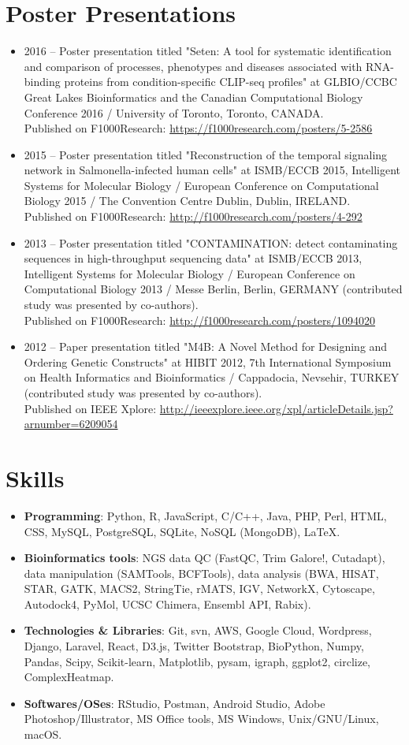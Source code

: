 \documentclass[a4paper,12pt]{article}
\newcommand{\resumeItem}[2]{
  \item\small{
    \textbf{#1}{: #2\vspace{-2pt}}
  }
}
\newcommand{\resumeItemUrl}[2]{
  \item\small{
    {#1}\\{#2\vspace{-2pt}}
  }
}
\newcommand{\resumeSubItem}[2]{\resumeItem{#1}{#2}\vspace{-4pt}}
\newcommand{\resumeSubItemUrl}[2]{\resumeItemUrl{#1}{#2}\vspace{-4pt}}
\newcommand{\resumeSubHeadingListStart}{\begin{itemize}[leftmargin=*]}
\newcommand{\resumeSubHeadingListEnd}{\end{itemize}}
\begin{document}
\section{Poster Presentations}
  \resumeSubHeadingListStart
    \resumeSubItemUrl{2016 -- Poster presentation titled "Seten: A tool for systematic identification and comparison of processes, phenotypes and diseases associated with RNA-binding proteins from condition-specific CLIP-seq profiles" at GLBIO/CCBC Great Lakes Bioinformatics and the Canadian Computational Biology Conference 2016 / University of Toronto, Toronto, CANADA.}
      {Published on F1000Research: \href{https://f1000research.com/posters/5-2586}{https://f1000research.com/posters/5-2586}}
    \resumeSubItemUrl{2015 -- Poster presentation titled "Reconstruction of the temporal signaling network in Salmonella-infected human cells" at ISMB/ECCB 2015, Intelligent Systems for Molecular Biology / European Conference on Computational Biology 2015 / The Convention Centre Dublin, Dublin, IRELAND.}
      {Published on F1000Research: \href{http://f1000research.com/posters/4-292}{http://f1000research.com/posters/4-292}}
    \resumeSubItemUrl{2013 -- Poster presentation titled "CONTAMINATION: detect contaminating sequences in high-throughput sequencing data" at ISMB/ECCB 2013, Intelligent Systems for Molecular Biology / European Conference on Computational Biology 2013 / Messe Berlin, Berlin, GERMANY (contributed study was presented by co-authors).}
      {Published on F1000Research: \href{http://f1000research.com/posters/1094020}{http://f1000research.com/posters/1094020}}
    \resumeSubItemUrl{2012 -- Paper presentation titled "M4B: A Novel Method for Designing and Ordering Genetic Constructs" at HIBIT 2012, 7th International Symposium on Health Informatics and Bioinformatics / Cappadocia, Nevsehir, TURKEY (contributed study was presented by co-authors).}
      {Published on IEEE Xplore: \href{http://ieeexplore.ieee.org/xpl/articleDetails.jsp?arnumber=6209054}{http://ieeexplore.ieee.org/xpl/articleDetails.jsp?arnumber=6209054}}
  \resumeSubHeadingListEnd

\section{Skills}
  \resumeSubHeadingListStart
    \resumeSubItem{Programming}
      {Python, R, JavaScript, C/C++, Java, PHP, Perl, HTML, CSS, MySQL, PostgreSQL, SQLite, NoSQL (MongoDB), \LaTeX.}
    \resumeSubItem{Bioinformatics tools}
      {NGS data QC (FastQC, Trim Galore!, Cutadapt), data manipulation (SAMTools, BCFTools), data analysis (BWA, HISAT, STAR, GATK, MACS2, StringTie, rMATS, IGV, NetworkX, Cytoscape, Autodock4, PyMol, UCSC Chimera, Ensembl API, Rabix).}
    \resumeSubItem{Technologies \& Libraries}
      {Git, svn, AWS, Google Cloud, Wordpress, Django, Laravel, React, D3.js, Twitter Bootstrap, BioPython, Numpy, Pandas, Scipy, Scikit-learn, Matplotlib, pysam, igraph, ggplot2, circlize, ComplexHeatmap.}
    \resumeSubItem{Softwares/OSes}
      {RStudio, Postman, Android Studio, Adobe Photoshop/Illustrator, MS Office tools, MS Windows, Unix/GNU/Linux, macOS.}
  \resumeSubHeadingListEnd
\end{document}

